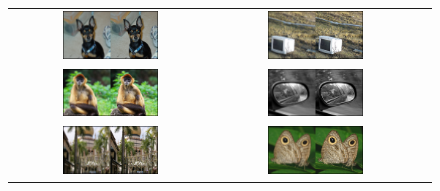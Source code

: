 \documentclass{article}
\begin{document}
\begin{figure}
    \centering
\begin{tabular}{@{}ccc@{}}
     \includegraphics[width=0.5\textwidth]{figures/upsampled/upsampled2/upsample_47.png} & \includegraphics[width=0.5\textwidth]{figures/upsampled/upsampled2/upsample_51.png} \\
     \includegraphics[width=0.5\textwidth]{figures/upsampled/upsampled2/upsample_59.png} & \includegraphics[width=0.5\textwidth]{figures/upsampled/upsampled2/upsample_61.png} \\
     \includegraphics[width=0.5\textwidth]{figures/upsampled/upsampled2/upsample_62.png} & \includegraphics[width=0.5\textwidth]{figures/upsampled/upsampled2/upsample_67.png} \\

\end{tabular}
\end{figure}
\end{document}
